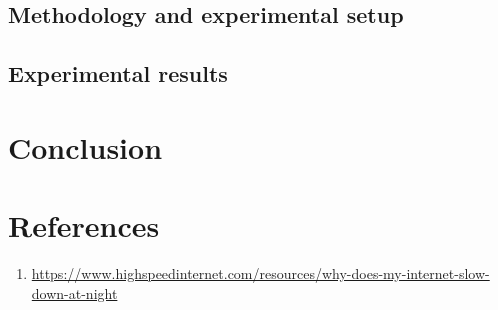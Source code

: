 \documentclass[a4paper,10pt]{article}
\begin{document}
\subsection{Methodology and experimental setup}
\subsection{Experimental results}
\section{Conclusion}


\clearpage

\section{References}


\begin{enumerate}

\item \label{article1}  \url{https://www.highspeedinternet.com/resources/why-does-my-internet-slow-down-at-night} 

\end{enumerate}
\end{document}
